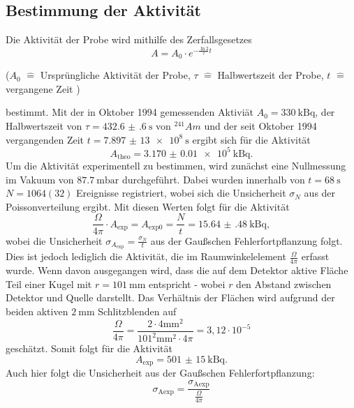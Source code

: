 \subsection{Bestimmung der Aktivität}
Die Aktivität der Probe wird mithilfe des Zerfallsgesetzes
\begin{equation}
    A = A_0 \cdot e^{-\frac{\ln{2}}{\tau}t}
\end{equation}

\begin{center}
    \tiny{($A_0 $ $\hat{=}$ Ursprüngliche Aktivität der Probe, $\tau$ $\hat{=}$ Halbwertszeit der Probe, $t$ $\hat{=}$ vergangene Zeit )}
\end{center}
bestimmt.
Mit der in Oktober 1994 gemessenden Aktiviät $A_0 = \SI{330}{\kilo\becquerel}$, der Halbwertszeit von $\tau = \SI{432.6(6)}{\second}$ von $^{241}{Am}$ und der seit Oktober 1994 vergangenden Zeit $t = \SI{7,897(13)e8}{\second}$ ergibt sich für die Aktivität
\begin{equation}
    A_\text{theo} = \SI{3.170(10)e5}{\kilo\becquerel} .
\end{equation}
Um die Aktivität experimentell zu bestimmen, wird zunächst eine Nullmessung im Vakuum von $\SI{87,7}{\milli \bar}$ durchgeführt. Dabei wurden innerhalb von $t=\SI{68}{\second}$ $N=1064(32)$ Ereignisse registriert, wobei sich die Unsicherheit $\sigma_N$ aus der Poissonverteilung ergibt.
Mit diesen Werten folgt für die Aktivität
\begin{equation}
    \frac{\Omega}{4 \pi } \cdot  A_\text{exp} = A_\text{exp0} = \frac{N}{t} = \SI{15.64(48)}{\kilo\becquerel} ,
\end{equation}
wobei die Unsicherheit $\sigma_{ A_\text{exp}} = \frac{\sigma_N}{t}$ aus der Gaußschen Fehlerfortpflanzung folgt.
Dies ist jedoch lediglich die Aktivität, die im Raumwinkelelement $\frac{\Omega}{4 \pi}$ erfasst wurde. Wenn davon ausgegangen wird, dass die auf dem Detektor aktive Fläche Teil einer Kugel mit $r = \SI{101}{\milli \meter}$ entspricht - wobei $r$ den Abstand zwischen Detektor und Quelle darstellt.
Das Verhältnis der Flächen wird aufgrund der beiden aktiven  $\SI{2}{\milli \meter}$ Schlitzblenden auf
\begin{equation}
    \frac{\Omega}{4 \pi } = \frac{2 \cdot 4 \si{\milli \meter}^2}{101^2 \si{\milli \meter}^2 \cdot 4\pi } = 3,12 \cdot 10^{-5}
\end{equation}
geschätzt.
Somit folgt für die Aktivität
\begin{equation}
    A_\text{exp} = \SI{501(15)}{\kilo\becquerel} .
\end{equation}
Auch hier folgt die Unsicherheit aus der Gaußschen Fehlerfortpflanzung:
\begin{equation}
    \sigma_\text{Aexp} =  \frac {\sigma_\text{Aexp}}{\frac{\Omega}{4 \pi }}
\end{equation}

